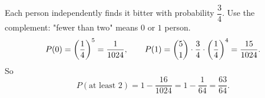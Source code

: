 Each person independently finds it bitter with probability $\dfrac{3}{4}$. Use the complement: "fewer than two" means $0$ or $1$ person.
\[
P(0)=\left(\dfrac{1}{4}\right)^5=\dfrac{1}{1024},\qquad P(1)=\dbinom51\cdot\dfrac{3}{4}\cdot\left(\dfrac{1}{4}\right)^4=\dfrac{15}{1024}.
\]
So
\[
P(\text{at least }2)=1-\dfrac{16}{1024}=1-\dfrac{1}{64}=\boxed{\dfrac{63}{64}}.
\]
